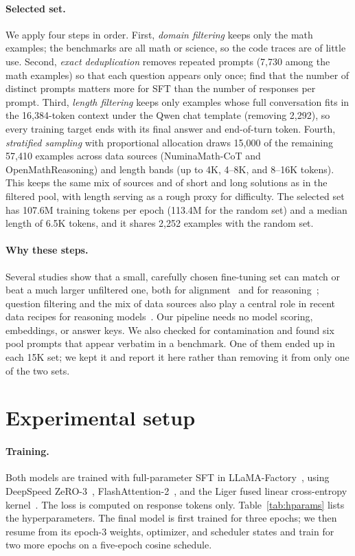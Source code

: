 \documentclass{article}
\begin{document}
\paragraph{Selected set.} We apply four steps in order. First, \emph{domain filtering} keeps only the math examples; the
benchmarks are all math or science, so the code traces are of little use. Second, \emph{exact deduplication} removes repeated
prompts (7,730 among the math examples) so that each question appears only once; \citet{acereason11} find that the
number of distinct prompts matters more for SFT than the number of responses per prompt. Third, \emph{length filtering} keeps only examples whose full conversation fits in the
16,384-token context under the Qwen chat template (removing 2,292), so every training target ends with its final answer and
end-of-turn token. Fourth, \emph{stratified sampling} with proportional allocation draws 15,000 of the remaining 57,410
examples across data sources (NuminaMath-CoT and OpenMathReasoning) and length bands (up to 4K, 4--8K, and 8--16K tokens).
This keeps the same mix of sources and of short and long solutions as in the filtered pool, with length serving as a rough
proxy for difficulty. The selected set has 107.6M training tokens per epoch (113.4M for the random set) and a median length of
6.5K tokens, and it shares 2,252 examples with the random set.

\paragraph{Why these steps.} Several studies show that a small, carefully chosen fine-tuning set can match or beat a much
larger unfiltered one, both for alignment~\citep{lima} and for reasoning~\citep{s1,limo}; question filtering and the mix of
data sources also play a central role in recent data recipes for reasoning models~\citep{openthoughts}. Our pipeline needs no
model scoring, embeddings, or answer keys. We also checked for contamination and found six pool prompts that appear verbatim
in a benchmark. One of them ended up in each 15K set; we kept it and report it here rather than removing it from only one of
the two sets.

\section{Experimental setup}

\paragraph{Training.} Both models are trained with full-parameter SFT in LLaMA-Factory~\citep{llamafactory}, using DeepSpeed
ZeRO-3~\citep{zero}, FlashAttention-2~\citep{flashattn2}, and the Liger fused linear cross-entropy kernel~\citep{liger}. The
loss is computed on response tokens only. Table~\ref{tab:hparams} lists the hyperparameters. The final model is first trained
for three epochs; we then resume from its epoch-3 weights, optimizer, and scheduler states and train for two more epochs on a
five-epoch cosine schedule.
\end{document}
